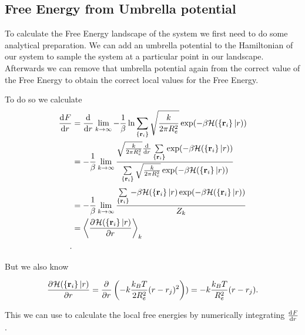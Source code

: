 \documentclass[../main.tex]{subfiles}
\begin{document}
\subsection{Free Energy from Umbrella potential}

To calculate the Free Energy landscape of the system we first need to do some analytical preparation.
We can add an umbrella potential to the Hamiltonian of our system to sample the system at a particular point in our landscape.
Afterwards we can remove that umbrella potential again from the correct value of the Free Energy to obtain the correct local values for the Free Energy. 
\par

To do so we calculate 
\begin{align*}
    \dv[]{F}{r} &= \dv[]{}{r} 
    \lim\limits_{k \to \infty} 
    -\frac{1}{\beta} 
    \ln 
    \sum\limits_{\left\{ \mathbf{r}_i \right\} }^{} 
    \sqrt{\frac{k}{2 \pi R_e^2}} 
    \exp( -  \beta\mathcal{H}(\left\{ \mathbf{r} _i \right\} | r ) ) \\
    &= 
    -\frac{1}{\beta} 
    \lim\limits_{k \to \infty}
    \frac{
        \sqrt{\frac{k}{2 \pi R_e^2}} 
        \dv[]{}{r} 
        \sum\limits_{\left\{ \mathbf{r}_i \right\} }^{} 
        \exp( -  \beta\mathcal{H}(\left\{ \mathbf{r} _i \right\} | r ) )
    }{
        \sum\limits_{\left\{ \mathbf{r}_i \right\} }^{} 
        \sqrt{\frac{k}{2 \pi R_e^2}} 
        \exp( -  \beta\mathcal{H}(\left\{ \mathbf{r} _i \right\} | r ) )
    }
    \\
    &= 
    -\frac{1}{\beta} 
    \lim\limits_{k \to \infty}
    \frac{
        \sum\limits_{\left\{ \mathbf{r}_i \right\} }^{} 
        - \beta\mathcal{H}(\left\{ \mathbf{r} _i \right\} | r )
        \exp( -  \beta\mathcal{H}(\left\{ \mathbf{r} _i \right\} | r ) )
    }{
        Z_k
    }
    \\
    &= 
    \left< 
    \pdv[]{
        \mathcal{H}(\left\{ \mathbf{r} _i \right\} | r )
    }{r} 
    \right>_k
    \\
.\end{align*}

But we also know 

\[
    \pdv[]{
        \mathcal{H}(\left\{ \mathbf{r} _i \right\} | r )
    }{r} 
    = 
    \pdv[]{}{r} \left( 
        -k \frac{k_B T}{2R_e^2} (r- r_j)^2
    \right) )
    = 
    -k \frac{k_B T}{R_e^2} (r- r_j)
.\] 

This we can use to calculate the local free energies by numerically integrating $\dv[]{F}{r} $.
\end{document}
